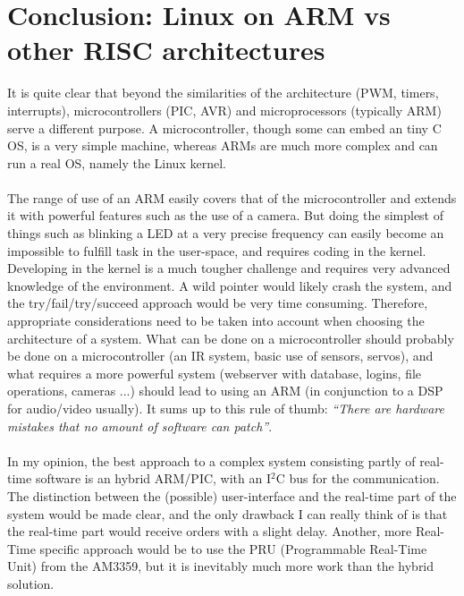 \chapter{Conclusion: Linux on ARM vs other RISC architectures }

It is quite clear that beyond the similarities of the architecture (PWM, timers, interrupts), microcontrollers (PIC, AVR) and microprocessors (typically ARM) serve a different purpose. A microcontroller, though some can embed an tiny C OS, is a very simple machine, whereas ARMs are much more complex and can run a real OS, namely the Linux kernel.
\\
\\
The range of use of an ARM easily covers that of the microcontroller and extends it with powerful features such as the use of a camera. But doing the simplest of things such as blinking a LED at a very precise frequency can easily become an impossible to fulfill task in the user-space, and requires coding in the kernel. Developing in the kernel is a much tougher challenge and requires very advanced knowledge of the environment. A wild pointer would likely crash the system, and the try/fail/try/succeed approach would be very time consuming.
Therefore, appropriate considerations need to be taken into account when choosing the architecture of a system. What can be done on a microcontroller should probably be done on a microcontroller (an IR system, basic use of sensors, servos), and what requires a more powerful system (webserver with database, logins, file operations, cameras ...) should lead to using an ARM (in conjunction to a DSP for audio/video usually). It sums up to this rule of thumb:
\textit{``There are hardware mistakes that no amount of software can patch''}.
\\
\\
In my opinion, the best approach to a complex system consisting partly of real-time software is an hybrid ARM/PIC, with an I$^{2}$C bus for the communication. The distinction between the (possible) user-interface and the real-time part of the system would be made clear, and the only drawback I can really think of is that the real-time part would receive orders with a slight delay.
Another, more Real-Time specific approach would be to use the PRU (Programmable Real-Time Unit) from the AM3359, but it is inevitably much more work than the hybrid solution.
